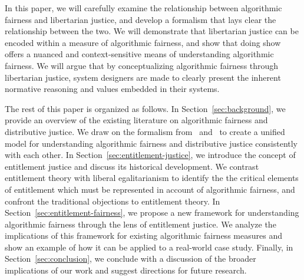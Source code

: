 In this paper, we will carefully examine the relationship between algorithmic
fairness and libertarian justice, and develop a formalism that lays clear the
relationship between the two. We will demonstrate that libertarian justice can
be encoded within a measure of algorithmic fairness, and show that doing show
offers a nuanced and context-sensitive means of understanding algorithmic
fairness. We will argue that by conceptualizing algorithmic fairness through
libertarian justice, system designers are made to clearly present the inherent
normative reasoning and values embedded in their systems.


The rest of this paper is organized as follows. In Section~\ref{sec:background},
we provide an overview of the existing literature on algorithmic fairness and
distributive justice. We draw on the formalism from~\citep{Kuppler_2021}
and~\citep{CorbettDavies_2023} to create a unified model for understanding
algorithmic fairness and distributive justice consistently with each other. 
In Section~\ref{sec:entitlement-justice}, we introduce the concept of
entitlement justice and discuss its historical development. We contrast
entitlement theory with liberal egalitarianism to identify the the critical
elements of entitlement which must be represented in account of algorithmic
fairness, and confront the traditional objections to entitlement theory. In
Section~\ref{sec:entitlement-fairness}, we propose a new framework for
understanding algorithmic fairness through the lens of entitlement justice. We
analyze the implications of this framework for existing algorithmic fairness
measures and show an example of how it can be applied to a real-world case
study. Finally, in Section~\ref{sec:conclusion}, we conclude with a discussion
of the broader implications of our work and suggest directions for future
research.
